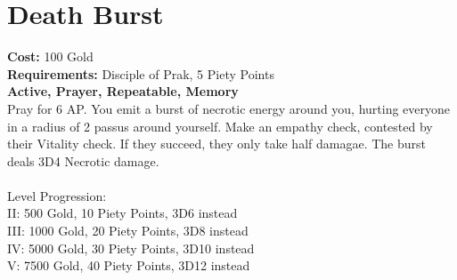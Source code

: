\section*{Death Burst}
\textbf{Cost:} 100 Gold\\
\textbf{Requirements:} Disciple of Prak, 5 Piety Points \\
\textbf{Active, Prayer, Repeatable, Memory}\\
Pray for 6 AP. You emit a burst of necrotic energy around you, hurting everyone in a radius of 2 passus around yourself. Make an empathy check, contested by their Vitality check. If they succeed, they only take half damagae. The burst deals 3D4 Necrotic damage.\\
\\
Level Progression:\\
II: 500 Gold, 10 Piety Points, 3D6 instead\\
III: 1000 Gold, 20 Piety Points, 3D8 instead\\
IV: 5000 Gold, 30 Piety Points, 3D10 instead\\
V: 7500 Gold, 40 Piety Points, 3D12 instead\\